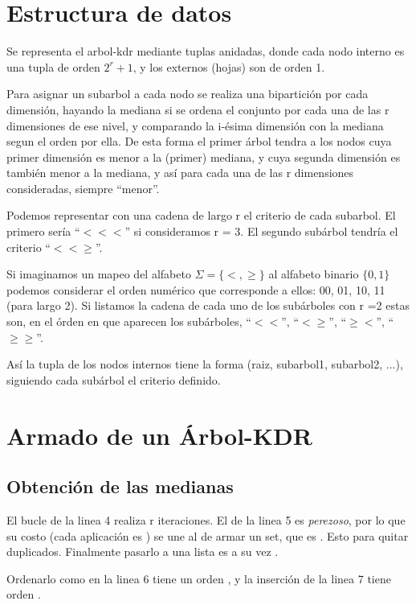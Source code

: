 \section{Estructura de datos}
Se representa el arbol-kdr mediante tuplas anidadas, donde cada
nodo interno es una tupla de orden $2^r + 1$, y los externos (hojas)
son de orden 1.

Para asignar un subarbol a cada nodo se realiza una bipartición por
cada dimensión, hayando la mediana si se ordena el conjunto por cada
una de las r dimensiones de ese nivel, y comparando la i-ésima
dimensión con la mediana segun el orden por ella.
De esta forma el primer árbol tendra a los nodos cuya primer
dimensión es menor a la (primer) mediana, y cuya segunda dimensión
es también menor a la mediana, y así para cada una de las r
dimensiones consideradas, siempre ``menor''.

Podemos representar con una cadena de largo r el
criterio de cada subarbol. El primero sería ``$<<<$'' si consideramos
r = 3. El segundo subárbol tendría el criterio ``$<<\geq$''.

Si imaginamos un mapeo del alfabeto $\Sigma = \{ <, \geq \}$ al
alfabeto binario $\{ 0, 1 \}$ podemos considerar el orden numérico
que corresponde a ellos: 00, 01, 10, 11 (para largo 2).
Si
listamos la cadena de cada uno de los subárboles con r =2 estas son,
en el órden en que aparecen los subárboles, ``$<<$'', ``$<\geq$'',
``$\geq<$'', ``$\geq\geq$''.

Así la tupla de los nodos internos tiene la forma (raiz, subarbol1,
subarbol2, ...), siguiendo cada subárbol el criterio definido.



\section{Armado de un Árbol-KDR}
\subsection{Obtención de las medianas}


El bucle de la linea 4 realiza r iteraciones. El  de la linea 5 es
\emph{perezoso}, por lo que su costo (cada aplicación es ) se une al de
armar un set, que es . Esto para quitar duplicados.
Finalmente pasarlo a una lista es a su vez .

Ordenarlo como en la linea 6 tiene un orden , y la inserción de
la linea 7 tiene orden .

